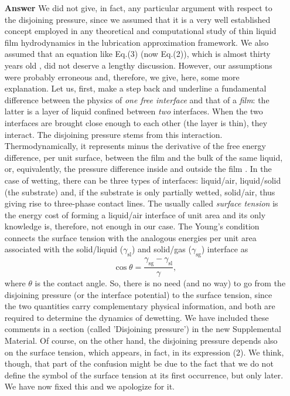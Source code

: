 \documentclass[12pt,english]{article}
\begin{document}
\begin{itemize}
\item[ \textbf{{Answer}}]
{
We did not give, in fact, any particular argument with respect to the disjoining pressure, since 
we assumed that it is a very well established concept employed in any theoretical and computational study of thin liquid film hydrodynamics in the lubrication approximation framework.
We also assumed that an equation like Eq.(3) (now Eq.(2)), which is almost thirty years old \cite{SCHWARTZ1998173,Mitlin94}, did not deserve a lengthy discussion.
However, our assumptions were probably erroneous and, therefore, we give, here, some more explanation. 
Let us, first, make a step back and underline a fundamental difference between the physics of {\it one free interface} and that of a {\it film}:
the latter is a layer of liquid confined between {\it two} interfaces. When the two interfaces are brought close enough to each other (the layer is thin), they interact.
The disjoining pressure stems from this interaction. Thermodynamically, it represents minus the derivative of the free energy difference, per unit surface, between 
the film and the bulk of the same liquid, or, equivalently, the pressure difference inside and outside the film 
\cite{Deryaguin1940,DeryaguinChuraev1978}.
In the case of wetting, there can be three types of interfaces: liquid/air, liquid/solid (the substrate) and, 
if the substrate is only partially wetted, solid/air, thus giving rise to three-phase contact lines. 
The usually called {\it surface tension} is the energy cost of forming a liquid/air interface of unit area and its only knowledge is, therefore, not enough in our case. 
The Young's condition \cite{Young1805,DeGennes1985} connects the surface tension with the analogous energies per unit
area associated with the solid/liquid ($\gamma_{\text{sl}}$) and solid/gas ($\gamma_{\text{sg}}$) interface as
\begin{equation}
\cos \theta = \frac{\gamma_{\text{sg}}-\gamma_{\text{sl}}}{\gamma},
\end{equation}
where $\theta$ is the contact angle.
So, there is no need (and no way) to go from the disjoining pressure (or the interface potential) to the surface tension, since the two quantities carry complementary physical information,
and both are required to determine the dynamics of dewetting.
We have included these comments in a section (called 'Disjoining pressure') 
in the new Supplemental Material.
Of course, on the other hand, the disjoining pressure depends also on the surface tension, which appears, in fact, in its expression (2). 
We think, though, that part of the confusion might be due to the fact that we do not define the symbol of the surface tension at its first occurrence, but only later. 
We have now fixed this and we apologize for it. 
}


\end{itemize}
\end{document}

